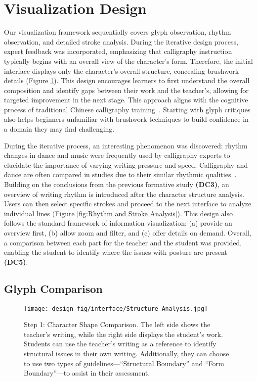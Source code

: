 \section{Visualization Design}
Our visualization framework sequentially covers glyph observation, rhythm observation, and detailed stroke analysis. During the iterative design process, expert feedback was incorporated, emphasizing that calligraphy instruction typically begins with an overall view of the character's form.
 Therefore, the initial interface displays only the character's overall structure, concealing brushwork details (Figure \ref{fig:Structure Analysis}). This design encourages learners to first understand the overall composition and identify gaps between their work and the teacher's, allowing for targeted improvement in the next stage. This approach aligns with the cognitive process of traditional Chinese calligraphy training~\cite{dong2008creation}. Starting with glyph critiques also helps beginners unfamiliar with brushwork techniques to build confidence in a domain they may find challenging.

During the iterative process, an interesting phenomenon was discovered: rhythm changes in dance and music were frequently used by calligraphy experts to elucidate the importance of varying writing pressure and speed. Calligraphy and dance are often compared in studies due to their similar rhythmic qualities~\cite{szeto2010calligraphic}. Building on the conclusions from the previous formative study\textbf{ (DC3)}, an overview of writing rhythm is introduced after the character structure analysis. Users can then select specific strokes and proceed to the next interface to analyze individual lines (Figure \ref{fig:Rhythm and Stroke Analysis}). This design also follows the standard framework of information visualization: (a) provide an overview first, (b) allow zoom and filter, and (c) offer details on demand\cite{shneiderman2003eyes}. Overall, a comparison between each part for the teacher and the student was provided, enabling the student to identify where the issues with posture are present \textbf{(DC5)}.

\subsection{Glyph Comparison}

\begin{figure}[t]
    \centering
    \texttt{[image: design\_fig/interface/Structure\_Analysis.jpg]}
    \caption{Step 1: Character Shape Comparison. The left side shows the teacher's writing, while the right side displays the student's work. Students can use the teacher's writing as a reference to identify structural issues in their own writing. Additionally, they can choose to use two types of guidelines—``Structural Boundary'' and ``Form Boundary''—to assist in their assessment.}
    \label{fig:Structure Analysis}
\end{figure}

